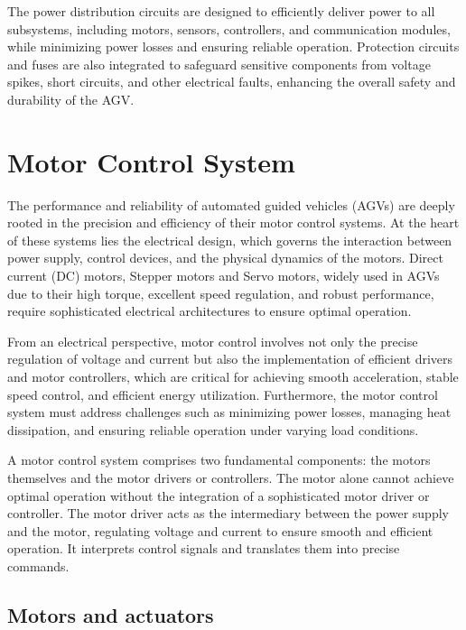 \documentclass[../../main]{subfiles}
\begin{document}
The power distribution circuits are designed to efficiently deliver power to all 
subsystems, including motors, sensors, controllers, and communication 
modules, while minimizing power losses and ensuring reliable operation. 
Protection circuits and fuses are also integrated to safeguard sensitive 
components from voltage spikes, short circuits, and other electrical faults, 
enhancing the overall safety and durability of the AGV.

\section{Motor Control System}

The performance and reliability of automated guided vehicles (AGVs) are deeply rooted in the precision and efficiency of
their motor control systems\cite{cservenak2018further}. At the heart of these systems lies the electrical design, which governs the interaction 
between power supply, control devices, and the physical dynamics of the motors. Direct current (DC) motors\cite{OrientalMotorAGV}, Stepper motors\cite{LinEngineering_AGV} and Servo motors\cite{AMC_AGV_Benefits}, widely 
used in AGVs due to their high torque, excellent speed regulation, and robust performance, require sophisticated electrical 
architectures to ensure optimal operation. 

From an electrical perspective, motor control involves not only the precise regulation of voltage and current but 
also the implementation of efficient drivers and motor controllers, which are critical for achieving smooth acceleration, 
stable speed control, and efficient energy utilization. Furthermore, the motor control system must address challenges 
such as minimizing power losses, managing heat dissipation, and ensuring reliable operation under varying load conditions. 

A motor control system comprises two fundamental components: the motors themselves and the motor drivers or controllers. 
The motor alone cannot achieve optimal operation without the integration of a sophisticated motor driver or controller. 
The motor driver acts as the intermediary between the power supply and the motor, regulating voltage and current to ensure 
smooth and efficient operation. It interprets control signals and translates them into precise commands.

\subsection{Motors and actuators}
\end{document}
